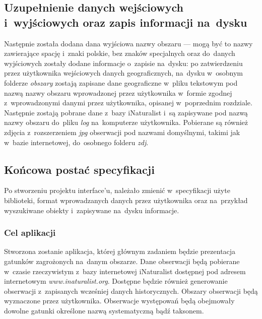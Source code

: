 \documentclass{article}
\begin{document}
 \subsection{Uzupełnienie danych wejściowych i~wyjściowych oraz zapis informacji na~dysku}
 Następnie została dodana dana wyjściowa nazwy obszaru --- mogą być to nazwy zawierające spację i~znaki polskie, bez znaków specjalnych oraz do~danych wyjściowych zostały dodane informacje o~zapisie na~dysku:  po zatwierdzeniu przez użytkownika wejściowych danych geograficznych, na~dysku w~osobnym folderze \textit{obszary} zostają zapisane dane geograficzne w~pliku tekstowym pod nazwą nazwy obszaru wprowadzonej przez użytkownika w~formie zgodnej z~wprowadzonymi danymi przez użytkownika, opisanej w~poprzednim rozdziale. Następnie zostają pobrane dane z~bazy iNaturalist i~są zapisywane pod nazwą nazwy obszaru do~pliku \textit{log} na~komputerze użytkownika. Pobierane są również zdjęcia z~rozszerzeniem \textit{jpg} obserwacji pod nazwami domyślnymi, takimi jak w~bazie internetowej, do~osobnego folderu \textit{zdj}.
 
 \subsection{Końcowa postać specyfikacji}
 Po stworzeniu projektu interface'u, należało zmienić w~specyfikacji użyte biblioteki, format wprowadzanych danych przez użytkownika oraz na~przykład wyszukiwane obiekty i~zapisywane na~dysku informacje.
\subsubsection{Cel aplikacji}

 Stworzona zostanie aplikacja, której głównym zadaniem będzie prezentacja gatunków zagrożonych na~danym obszarze. Dane obserwacji będą pobierane w~czasie rzeczywistym z~bazy internetowej iNaturalist dostępnej pod adresem internetowym \textit{www.inaturalist.org}. Dostępne będzie również generowanie obserwacji z~zapisanych wcześniej danych historycznych. Obszary obserwacji będą  wyznaczone przez użytkownika. Obserwacje występowań będą obejmowały dowolne gatunki określone nazwą systematyczną bądź taksonem. 
\end{document}
